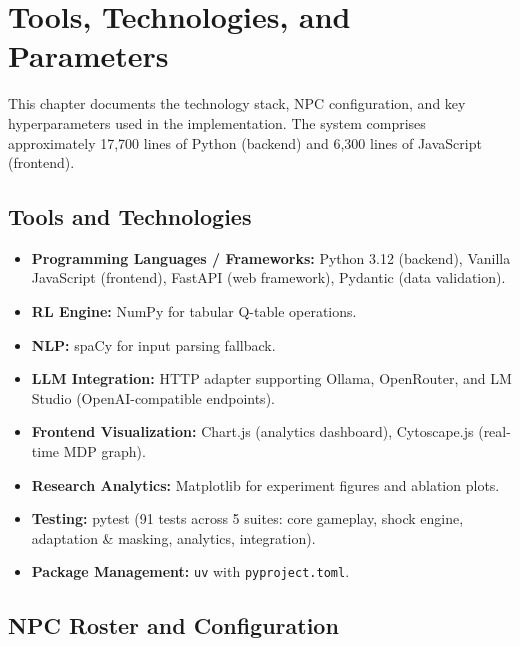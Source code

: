 \documentclass[12pt, a4paper, oneside]{report}
\begin{document}
\chapter{Tools, Technologies, and Parameters}
\label{chap:tools}

This chapter documents the technology stack, NPC configuration, and key hyperparameters used in the implementation. The system comprises approximately 17,700 lines of Python (backend) and 6,300 lines of JavaScript (frontend).

\section{Tools and Technologies}
\label{sec:tools-tech}

\begin{itemize}
    \item \textbf{Programming Languages / Frameworks:} Python 3.12 (backend), Vanilla JavaScript (frontend), FastAPI (web framework), Pydantic (data validation).
    \item \textbf{RL Engine:} NumPy for tabular Q-table operations.
    \item \textbf{NLP:} spaCy for input parsing fallback.
    \item \textbf{LLM Integration:} HTTP adapter supporting Ollama, OpenRouter, and LM Studio (OpenAI-compatible endpoints).
    \item \textbf{Frontend Visualization:} Chart.js (analytics dashboard), Cytoscape.js (real-time MDP graph).
    \item \textbf{Research Analytics:} Matplotlib for experiment figures and ablation plots.
    \item \textbf{Testing:} pytest (91 tests across 5 suites: core gameplay, shock engine, adaptation \& masking, analytics, integration).
    \item \textbf{Package Management:} \texttt{uv} with \texttt{pyproject.toml}.
\end{itemize}

\section{NPC Roster and Configuration}
\label{sec:npc-roster}
\end{document}
